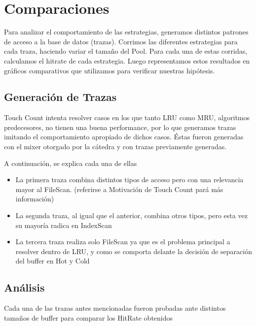 \section{Comparaciones}
Para analizar el comportamiento de las estrategias, generamos distintos patrones de
acceso a la base de datos (trazas). Corrimos las diferentes estrategias para cada traza,
haciendo variar el tamaño del Pool. Para cada una de estas corridas, calculamos el 
hitrate de cada estrategia. Luego representamos estos resultados en gráficos comparativos
que utilizamos para verificar nuestras hipótesis.

\subsection{Generación de Trazas}
Touch Count intenta resolver casos en los que tanto LRU como MRU, algoritmos predecesores, no tienen una buena performance, por lo que
generamos trazas imitando el comportamiento apropiado de dichos casos. Éstas fueron generadas con
el mixer otorgado por la cátedra y con trazas previamente generadas. 

A continuación, se explica cada una de ellas

\begin{itemize}
\item{La primera traza combina distintos tipos de acceso pero con una relevancia mayor al FileScan. 
(referirse a Motivación de Touch Count pará más información)}
\item{La segunda traza, al igual que el anterior, combina otros tipos, pero esta vez su mayoría radica en IndexScan}
\item{La tercera traza realiza solo FileScan ya que es el problema principal a resolver dentro de LRU, y como se comporta delante la decisión de separación del buffer en Hot y Cold}
\end{itemize}

\subsection{Análisis}
Cada una de las trazas antes mencionadas fueron probadas ante distintos tamaños de buffer para comparar los HitRate obtenidos

